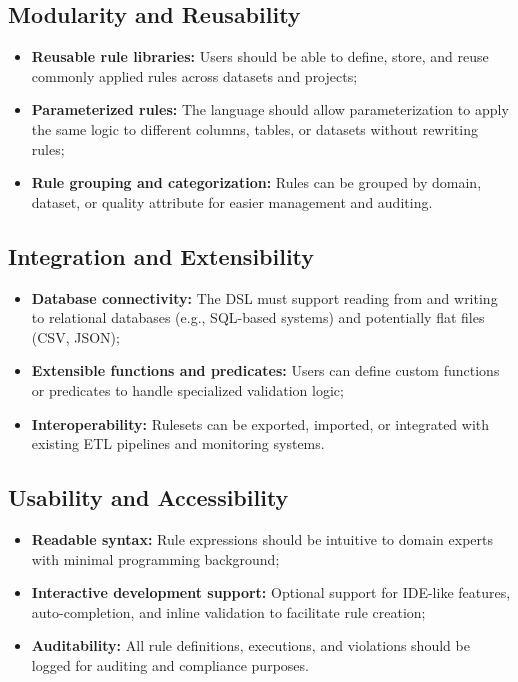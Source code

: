 \begin{itemize}[label=-, noitemsep]
\subsection{Modularity and Reusability}
\begin{itemize}[label=-, noitemsep]
    \item \textbf{Reusable rule libraries:} Users should be able to define, store, and reuse commonly applied rules across datasets and projects;
    \item \textbf{Parameterized rules:} The language should allow parameterization to apply the same logic to different columns, tables, or datasets without rewriting rules;
    \item \textbf{Rule grouping and categorization:} Rules can be grouped by domain, dataset, or quality attribute for easier management and auditing.
\end{itemize}

\subsection{Integration and Extensibility}
\begin{itemize}[label=-, noitemsep]
    \item \textbf{Database connectivity:} The DSL must support reading from and writing to relational databases (e.g., SQL-based systems) and potentially flat files (CSV, JSON);
    \item \textbf{Extensible functions and predicates:} Users can define custom functions or predicates to handle specialized validation logic;
    \item \textbf{Interoperability:} Rulesets can be exported, imported, or integrated with existing ETL pipelines and monitoring systems.
\end{itemize}

\subsection{Usability and Accessibility}
\begin{itemize}[label=-, noitemsep]
    \item \textbf{Readable syntax:} Rule expressions should be intuitive to domain experts with minimal programming background;
    \item \textbf{Interactive development support:} Optional support for IDE-like features, auto-completion, and inline validation to facilitate rule creation;
    \item \textbf{Auditability:} All rule definitions, executions, and violations should be logged for auditing and compliance purposes.
\end{itemize}


\end{itemize}
